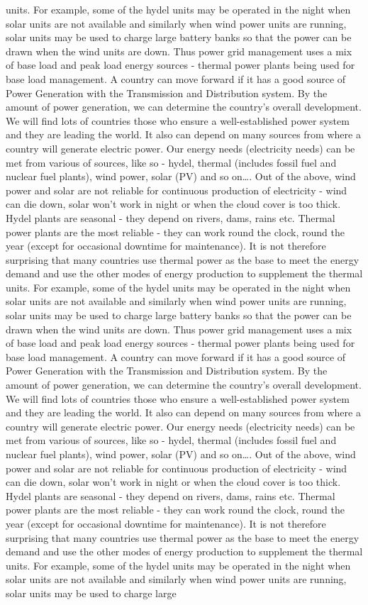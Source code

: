 \documentclass[10pt, a4paper]{article}
\begin{document}
units. For example, some of the hydel units may be operated in the night when solar units are not available and similarly when wind power units are running, solar units may be used to charge large battery banks so that the power can be drawn when the wind units are down. Thus power grid management uses a mix of base load and peak load energy sources - thermal power plants being used for base load management. A country can move forward if it has a good source of Power Generation with the Transmission and Distribution system. By the amount of power generation, we can determine the country’s overall development. We will find lots of countries those who ensure a well-established power system and they are leading the world. It also can depend on many sources from where a country will generate electric power. Our energy needs (electricity needs) can be met from various of sources, like so - hydel, thermal (includes fossil fuel and nuclear fuel plants), wind power, solar (PV) and so on\dots. Out of the above, wind power and solar are not reliable for continuous production of electricity - wind can die down, solar won’t work in night or when the cloud cover is too thick. Hydel plants are seasonal - they depend on rivers, dams, rains etc. Thermal power plants are the most reliable - they can work round the clock, round the year (except for occasional downtime for maintenance). It is not therefore surprising that many countries use thermal power as the base to meet the energy demand and use the other modes of energy production to supplement the thermal units. For example, some of the hydel units may be operated in the night when solar units are not available and similarly when wind power units are running, solar units may be used to charge large battery banks so that the power can be drawn when the wind units are down. Thus power grid management uses a mix of base load and peak load energy sources - thermal power plants being used for base load management. A country can move forward if it has a good source of Power Generation with the Transmission and Distribution system. By the amount of power generation, we can determine the country’s overall development. We will find lots of countries those who ensure a well-established power system and they are leading the world. It also can depend on many sources from where a country will generate electric power. Our energy needs (electricity needs) can be met from various of sources, like so - hydel, thermal (includes fossil fuel and nuclear fuel plants), wind power, solar (PV) and so on\dots. Out of the above, wind power and solar are not reliable for continuous production of electricity - wind can die down, solar won’t work in night or when the cloud cover is too thick. Hydel plants are seasonal - they depend on rivers, dams, rains etc. Thermal power plants are the most reliable - they can work round the clock, round the year (except for occasional downtime for maintenance). It is not therefore surprising that many countries use thermal power as the base to meet the energy demand and use the other modes of energy production to supplement the thermal units. For example, some of the hydel units may be operated in the night when solar units are not available and similarly when wind power units are running, solar units may be used to charge large 
\end{document}
